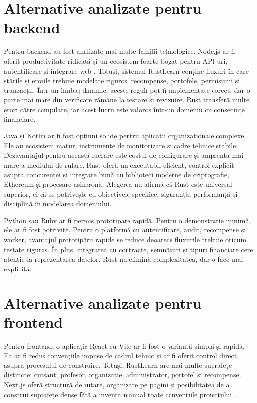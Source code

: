 \section{Alternative analizate pentru backend}
Pentru backend au fost analizate mai multe familii tehnologice. Node.js ar fi oferit productivitate ridicată și un ecosistem foarte bogat pentru API-uri, autentificare și integrare web \cite{frontendBackendWebDev}. Totuși, sistemul RustLearn conține fluxuri în care stările și erorile trebuie modelate riguros: recompense, portofele, permisiuni și tranzacții. Într-un limbaj dinamic, aceste reguli pot fi implementate corect, dar o parte mai mare din verificare rămâne la testare și revizuire. Rust transferă multe erori către compilare, iar acest lucru este valoros într-un domeniu cu consecințe financiare.

Java și Kotlin ar fi fost opțiuni solide pentru aplicații organizaționale complexe. Ele au ecosistem matur, instrumente de monitorizare și cadre tehnice stabile. Dezavantajul pentru această lucrare este costul de configurare și amprenta mai mare a mediului de rulare. Rust oferă un executabil eficient, control explicit asupra concurenței și integrare bună cu biblioteci moderne de criptografie, Ethereum și procesare asincronă. Alegerea nu afirmă că Rust este universal superior, ci că se potrivește cu obiectivele specifice: siguranță, performanță și disciplină în modelarea domeniului.

Python sau Ruby ar fi permis prototipare rapidă. Pentru o demonstrație minimă, ele ar fi fost potrivite. Pentru o platformă cu autentificare, audit, recompense și worker, avantajul prototipării rapide se reduce deoarece fluxurile trebuie oricum testate riguros. În plus, integrarea cu contracte, semnături și tipuri financiare cere atenție la reprezentarea datelor. Rust nu elimină complexitatea, dar o face mai explicită.

\section{Alternative analizate pentru frontend}
Pentru frontend, o aplicație React cu Vite ar fi fost o variantă simplă și rapidă. Ea ar fi redus convențiile impuse de cadrul tehnic și ar fi oferit control direct asupra procesului de construire. Totuși, RustLearn are mai multe suprafețe distincte: cursant, profesor, organizație, administrator, portofel și recompense. Next.js oferă structură de rutare, organizare pe pagini și posibilitatea de a construi suprafețe dense fără a inventa manual toate convențiile proiectului \cite{nextAppDocs}.

